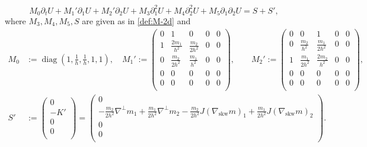 \documentclass[reqno,11pt]{amsart}
\DeclareMathOperator{\diag}{diag}
\theoremstyle{plain}
\theoremstyle{definition}
\numberwithin{equation}{section}
\begin{document}
\begin{equation}
    \label{ShallowWaterMomentum2D-1}
    M_0\partial_t U+M_1' \partial_1 U +M_2' \partial_2 U +M_3\partial_1^2 U +M_4\partial_2^2 U +M_5\partial_{1}\partial_2 U=S + S',
\end{equation}
where $ M_3, M_4, M_5, S $ are given as in \eqref{def:M-2d} and
\begin{equation}
    \label{def:M-2d-1}
    \begin{aligned}
    M_0& :=\diag\left(1,\frac{1}{h},\frac{1}{h},1,1\right), \quad    M_1' :=\begin{pmatrix}
        0 & 1 & 0 & 0 & 0 \\
        1 & \frac{2m_1}{h^2} & {\frac{m_2}{2h^2}} & 0 & 0 \\
        0 & {\frac{m_2}{2h^2}} & \frac{m_1}{h^2} & 0 & 0 \\
        0 & 0 & 0 & 0 & 0 \\
        0 & 0 & 0 & 0 & 0 \\
    \end{pmatrix}, \qquad M_2' :=
    \begin{pmatrix}
        0 & 0 & 1 & 0 & 0 \\
        0 & \frac{m_2}{h^2} & {\frac{m_1}{2 h^2}} & 0 & 0 \\
        1 & {\frac{m_1}{2 h^2}} & \frac{2m_2}{h^2} & 0 & 0 \\
        0 & 0 & 0 & 0 & 0 \\
        0 & 0 & 0 & 0 & 0 \\
    \end{pmatrix}, \\
    S' & := \begin{pmatrix}
        0 \\
        - K' \\
        0 \\
        0 \\
    \end{pmatrix} = \begin{pmatrix}
        0 \\
        - \frac{m_2}{2h^2} \nabla^\perp m_1 + \frac{m_1}{2h^2} \nabla^\perp m_2 - \frac{m_2}{2h^2} J (\nabla_\mathrm{skw}m)_1 + \frac{m_1}{2h^2} J (\nabla_\mathrm{skw}m)_2 \\
        0 \\
        0 \\
    \end{pmatrix}.
    \end{aligned}
\end{equation}
\end{document}
